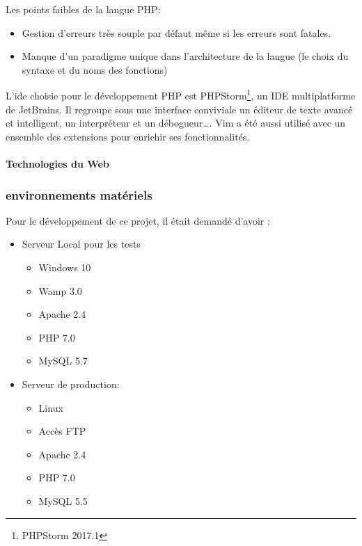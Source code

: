 Les points faibles de la langue PHP:
\begin{itemize}
    \item Gestion d'erreurs très souple par défaut même si les erreurs sont
        fatales.
    \item Manque d'un paradigme unique dans l'architecture de la langue (le
        choix du syntaxe et du noms des fonctions)
\end{itemize}

L'ide choisie pour le développement PHP est PHPStorm\footnote{PHPStorm 2017.1},
un IDE multiplatforme de JetBrains. Il regroupe sous une interface conviviale
un éditeur de texte avancé et intelligent, un interpréteur et un
débogueur\ldots.  Vim a été aussi utilisé avec un ensemble des extensions pour
enrichir ses fonctionnalités.

%

\paragraph{Technologies du Web}



\subsubsection{environnements matériels}

Pour le développement de ce projet, il était demandé d'avoir :
\begin{itemize}
 \item Serveur Local pour les tests
     \begin{itemize}
         \item Windows 10
         \item Wamp 3.0
         \item Apache 2.4
         \item PHP 7.0
         \item MySQL 5.7
     \end{itemize}
 \item Serveur de production:
     \begin{itemize}
      \item Linux
      \item Accès FTP
      \item Apache 2.4
      \item PHP 7.0
      \item MySQL 5.5
     \end{itemize}
\end{itemize}

